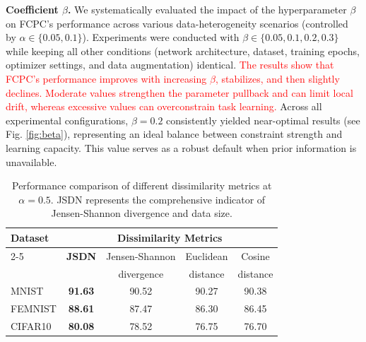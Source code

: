 \documentclass[journal,twoside,web]{ieeecolor}
\newcommand{\rev}[1]{\textcolor{red}{#1}}
\begin{document}
\textbf{Coefficient $\beta$. }We systematically evaluated the impact of the hyperparameter $\beta$ on FCPC's performance across various data-heterogeneity scenarios (controlled by $\alpha \in \{0.05, 0.1\}$). Experiments were conducted with $\beta \in \{0.05, 0.1, 0.2, 0.3\}$ while keeping all other conditions (network architecture, dataset, training epochs, optimizer settings, and data augmentation) identical.
\rev{The results show that FCPC's performance improves with increasing $\beta$, stabilizes, and then slightly declines. Moderate values strengthen the parameter pullback and can limit local drift, whereas excessive values can overconstrain task learning.}
Across all experimental configurations, $\beta = 0.2$ consistently yielded near-optimal results (see Fig. \ref{fig:beta}), representing an ideal balance between constraint strength and learning capacity. This value serves as a robust default when prior information is unavailable.


\begin{table}[htbp]
\caption{Performance comparison of different dissimilarity metrics at $\alpha = 0.5$. JSDN represents the comprehensive indicator of Jensen-Shannon divergence and data size.}
\label{tab:dissimilarity}
\centering
\footnotesize  %
\begin{tabular}{lcccc}
\toprule
\multirow{2}{*}{Dataset} & \multicolumn{4}{c}{Dissimilarity Metrics} \\
\cmidrule(lr){2-5}
& \textbf{JSDN} & \multicolumn{1}{c}{Jensen-Shannon} & \multicolumn{1}{c}{Euclidean} & \multicolumn{1}{c}{Cosine} \\
& & \multicolumn{1}{c}{divergence} & \multicolumn{1}{c}{distance} & \multicolumn{1}{c}{distance} \\
\midrule
MNIST    & \textbf{91.63} & 90.52 & 90.27 & 90.38 \\
FEMNIST  & \textbf{88.61} & 87.47 & 86.30 & 86.45 \\
CIFAR10  & \textbf{80.08} & 78.52 & 76.75 & 76.70 \\
\bottomrule
\end{tabular}
\label{tab:comparsion of metrics}
\end{table}



\end{document}

